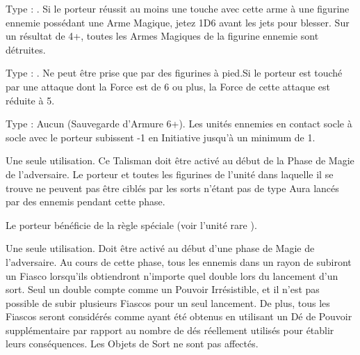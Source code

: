Type : \ironfist{}. Si le porteur réussit au moins une touche avec cette arme à une figurine ennemie possédant une Arme Magique, jetez 1D6 avant les jets pour blesser. Sur un résultat de 4+, toutes les Armes Magiques de la figurine ennemie sont détruites.

\endpricelist

\armymagicalarmour

\startpricelist

Type : \ha{}. Ne peut être prise que par des figurines à pied.\newline Si le porteur est touché par une attaque dont la Force est de 6 ou plus, la Force de cette attaque est réduite à 5.

Type : Aucun (Sauvegarde d'Armure 6+). Les unités ennemies en contact socle à socle avec le porteur subissent -1 en Initiative jusqu'à un minimum de 1.

\endpricelist

\armytalismans

\startpricelist

Une seule utilisation. Ce Talisman doit être activé au début de la Phase de Magie de l'adversaire. Le porteur et toutes les figurines de l'unité dans laquelle il se trouve ne peuvent pas être ciblés par les sorts n'étant pas de type Aura lancés par des \wizards{} ennemis pendant cette phase.

\endpricelist

\armyenchanteditems

\startpricelist

Le porteur bénéficie de la règle spéciale \stoneskin{} (voir l'unité rare \rockaurochs{}).

\endpricelist

\armyarcaneitems

\startpricelist

Une seule utilisation. Doit être activé au début d'une phase de Magie de l'adversaire. Au cours de cette phase, tous les \wizards{} ennemis dans un rayon de  subiront un Fiasco lorsqu'ils obtiendront n'importe quel double lors du lancement d'un sort. Seul un double  compte comme un Pouvoir Irrésistible, et il n'est pas possible de subir plusieurs Fiascos pour un seul lancement. De plus, tous les Fiascos seront considérés comme ayant été obtenus en utilisant un Dé de Pouvoir supplémentaire par rapport au nombre de dés réellement utilisés pour établir leurs conséquences. Les Objets de Sort ne sont pas affectés.

